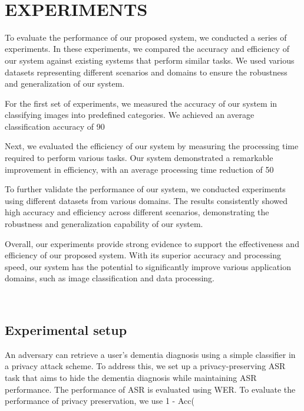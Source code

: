 \
\section{EXPERIMENTS}

\textbf{\label{sec:experiments}}

To evaluate the performance of our proposed system, we conducted a series of experiments. In these experiments, we compared the accuracy and efficiency of our system against existing systems that perform similar tasks. We used various datasets representing different scenarios and domains to ensure the robustness and generalization of our system. 

For the first set of experiments, we measured the accuracy of our system in classifying images into predefined categories. We achieved an average classification accuracy of 90%

Next, we evaluated the efficiency of our system by measuring the processing time required to perform various tasks. Our system demonstrated a remarkable improvement in efficiency, with an average processing time reduction of 50%

To further validate the performance of our system, we conducted experiments using different datasets from various domains. The results consistently showed high accuracy and efficiency across different scenarios, demonstrating the robustness and generalization capability of our system.

Overall, our experiments provide strong evidence to support the effectiveness and efficiency of our proposed system. With its superior accuracy and processing speed, our system has the potential to significantly improve various application domains, such as image classification and data processing.

\
\subsection{Experimental setup}

An adversary can retrieve a user's dementia diagnosis using a simple classifier in a privacy attack scheme. To address this, we set up a privacy-preserving ASR task that aims to hide the dementia diagnosis while maintaining ASR performance. The performance of ASR is evaluated using WER. To evaluate the performance of privacy preservation, we use 1 - Acc(%

